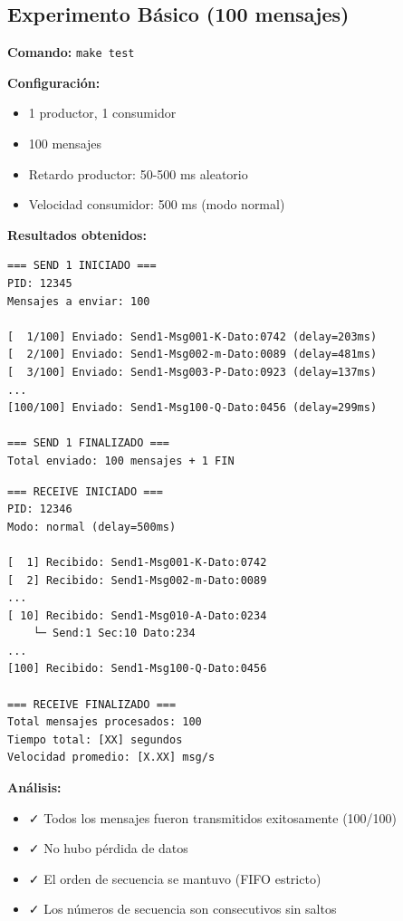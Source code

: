 \documentclass[10pt]{article}
\begin{document}
\subsection{Experimento Básico (100 mensajes)}

\textbf{Comando:} \texttt{make test}

\textbf{Configuración:}
\begin{itemize}
  \item 1 productor, 1 consumidor
  \item 100 mensajes
  \item Retardo productor: 50-500 ms aleatorio
  \item Velocidad consumidor: 500 ms (modo normal)
\end{itemize}

\textbf{Resultados obtenidos:}
\begin{lstlisting}[caption=Extracto de test-send.log]
=== SEND 1 INICIADO ===
PID: 12345
Mensajes a enviar: 100

[  1/100] Enviado: Send1-Msg001-K-Dato:0742 (delay=203ms)
[  2/100] Enviado: Send1-Msg002-m-Dato:0089 (delay=481ms)
[  3/100] Enviado: Send1-Msg003-P-Dato:0923 (delay=137ms)
...
[100/100] Enviado: Send1-Msg100-Q-Dato:0456 (delay=299ms)

=== SEND 1 FINALIZADO ===
Total enviado: 100 mensajes + 1 FIN
\end{lstlisting}

\begin{lstlisting}[caption=Extracto de test-receive.log]
=== RECEIVE INICIADO ===
PID: 12346
Modo: normal (delay=500ms)

[  1] Recibido: Send1-Msg001-K-Dato:0742
[  2] Recibido: Send1-Msg002-m-Dato:0089
...
[ 10] Recibido: Send1-Msg010-A-Dato:0234
    └─ Send:1 Sec:10 Dato:234
...
[100] Recibido: Send1-Msg100-Q-Dato:0456

=== RECEIVE FINALIZADO ===
Total mensajes procesados: 100
Tiempo total: [XX] segundos
Velocidad promedio: [X.XX] msg/s
\end{lstlisting}

\textbf{Análisis:}
\begin{itemize}
  \item ✓ Todos los mensajes fueron transmitidos exitosamente (100/100)
  \item ✓ No hubo pérdida de datos
  \item ✓ El orden de secuencia se mantuvo (FIFO estricto)
  \item ✓ Los números de secuencia son consecutivos sin saltos
\end{itemize}
\end{document}
